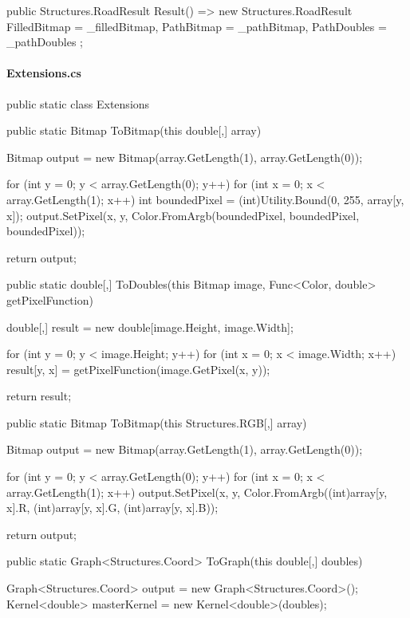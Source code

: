\begin{flushleft}
\begin{cscode}
{    public Structures.RoadResult Result() => new Structures.RoadResult
    {
        FilledBitmap = _filledBitmap,
        PathBitmap = _pathBitmap,
        PathDoubles = _pathDoubles
    };
}
    \end{cscode}
    
    
    \paragraph{Extensions.cs}
    \begin{cscode}
public static class Extensions
{
    public static Bitmap ToBitmap(this double[,] array)
    {
        Bitmap output = new Bitmap(array.GetLength(1), array.GetLength(0));

        for (int y = 0; y < array.GetLength(0); y++)
        {
            for (int x = 0; x < array.GetLength(1); x++)
            {
                int boundedPixel = (int)Utility.Bound(0, 255, array[y, x]);
                output.SetPixel(x, y, Color.FromArgb(boundedPixel, boundedPixel, boundedPixel));
            }
        }

        return output;
    }

    public static double[,] ToDoubles(this Bitmap image, Func<Color, double> getPixelFunction)
    {
        double[,] result = new double[image.Height, image.Width];

        for (int y = 0; y < image.Height; y++)
        {
            for (int x = 0; x < image.Width; x++)
            {
                result[y, x] = getPixelFunction(image.GetPixel(x, y));
            }
        }

        return result;
    }

    public static Bitmap ToBitmap(this Structures.RGB[,] array)
    {
        Bitmap output = new Bitmap(array.GetLength(1), array.GetLength(0));

        for (int y = 0; y < array.GetLength(0); y++)
        {
            for (int x = 0; x < array.GetLength(1); x++)
            {
                output.SetPixel(x, y, Color.FromArgb((int)array[y, x].R, (int)array[y, x].G, (int)array[y, x].B));
            }
        }

        return output;
    }

    public static Graph<Structures.Coord> ToGraph(this double[,] doubles)
    {
        Graph<Structures.Coord> output = new Graph<Structures.Coord>();
        Kernel<double> masterKernel = new Kernel<double>(doubles);

}}
\end{cscode}
\end{flushleft}
